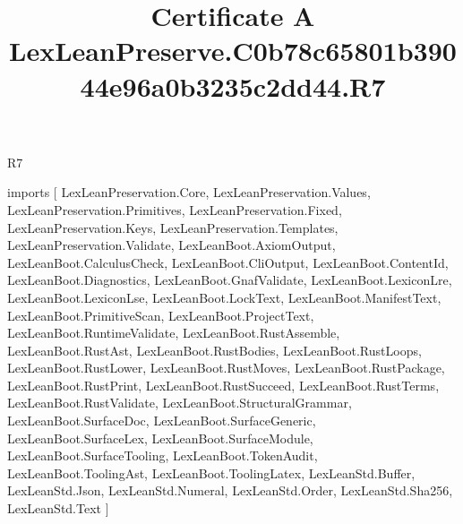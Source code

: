 \begin{lexlean}{R7}
\title{Certificate A LexLeanPreserve.C0b78c65801b39044e96a0b3235c2dd44.R7}
\begin{coremodule}
imports [
  LexLeanPreservation.Core,
  LexLeanPreservation.Values,
  LexLeanPreservation.Primitives,
  LexLeanPreservation.Fixed,
  LexLeanPreservation.Keys,
  LexLeanPreservation.Templates,
  LexLeanPreservation.Validate,
  LexLeanBoot.AxiomOutput,
  LexLeanBoot.CalculusCheck,
  LexLeanBoot.CliOutput,
  LexLeanBoot.ContentId,
  LexLeanBoot.Diagnostics,
  LexLeanBoot.GnafValidate,
  LexLeanBoot.LexiconLre,
  LexLeanBoot.LexiconLse,
  LexLeanBoot.LockText,
  LexLeanBoot.ManifestText,
  LexLeanBoot.PrimitiveScan,
  LexLeanBoot.ProjectText,
  LexLeanBoot.RuntimeValidate,
  LexLeanBoot.RustAssemble,
  LexLeanBoot.RustAst,
  LexLeanBoot.RustBodies,
  LexLeanBoot.RustLoops,
  LexLeanBoot.RustLower,
  LexLeanBoot.RustMoves,
  LexLeanBoot.RustPackage,
  LexLeanBoot.RustPrint,
  LexLeanBoot.RustSucceed,
  LexLeanBoot.RustTerms,
  LexLeanBoot.RustValidate,
  LexLeanBoot.StructuralGrammar,
  LexLeanBoot.SurfaceDoc,
  LexLeanBoot.SurfaceGeneric,
  LexLeanBoot.SurfaceLex,
  LexLeanBoot.SurfaceModule,
  LexLeanBoot.SurfaceTooling,
  LexLeanBoot.TokenAudit,
  LexLeanBoot.ToolingAst,
  LexLeanBoot.ToolingLatex,
  LexLeanStd.Buffer,
  LexLeanStd.Json,
  LexLeanStd.Numeral,
  LexLeanStd.Order,
  LexLeanStd.Sha256,
  LexLeanStd.Text
]


\end{coremodule}
\end{lexlean}
